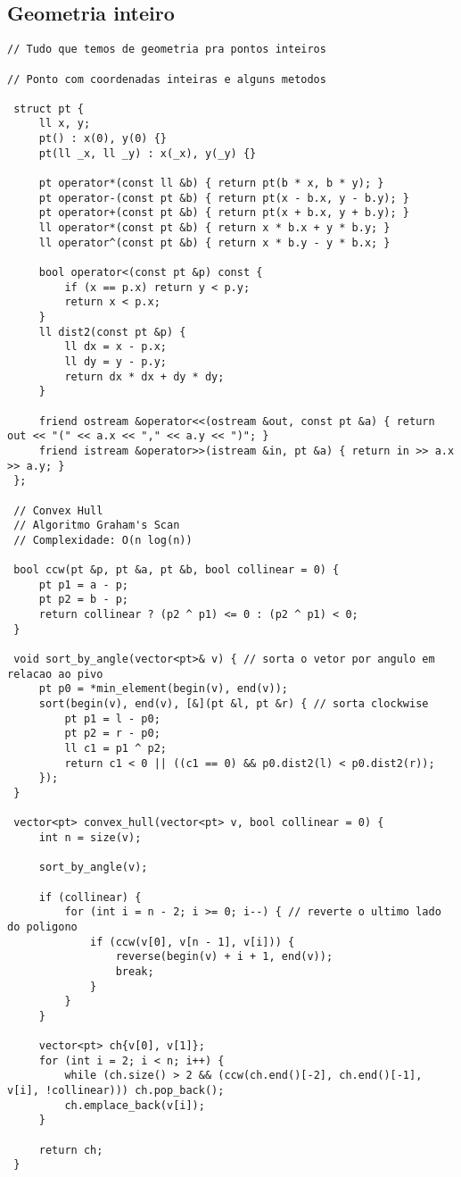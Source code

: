 \documentclass[11pt, a4paper, twoside]{article}
\begin{document}
\subsection{Geometria inteiro}
\begin{lstlisting}
// Tudo que temos de geometria pra pontos inteiros

// Ponto com coordenadas inteiras e alguns metodos

 struct pt {
     ll x, y;
     pt() : x(0), y(0) {}
     pt(ll _x, ll _y) : x(_x), y(_y) {}
 
     pt operator*(const ll &b) { return pt(b * x, b * y); }
     pt operator-(const pt &b) { return pt(x - b.x, y - b.y); }
     pt operator+(const pt &b) { return pt(x + b.x, y + b.y); }
     ll operator*(const pt &b) { return x * b.x + y * b.y; }
     ll operator^(const pt &b) { return x * b.y - y * b.x; }
 
     bool operator<(const pt &p) const {
         if (x == p.x) return y < p.y;
         return x < p.x;
     }
     ll dist2(const pt &p) {
         ll dx = x - p.x;
         ll dy = y - p.y;
         return dx * dx + dy * dy;
     }
 
     friend ostream &operator<<(ostream &out, const pt &a) { return out << "(" << a.x << "," << a.y << ")"; }
     friend istream &operator>>(istream &in, pt &a) { return in >> a.x >> a.y; }
 };
 
 // Convex Hull
 // Algoritmo Graham's Scan
 // Complexidade: O(n log(n))
 
 bool ccw(pt &p, pt &a, pt &b, bool collinear = 0) {
     pt p1 = a - p;
     pt p2 = b - p;
     return collinear ? (p2 ^ p1) <= 0 : (p2 ^ p1) < 0;
 }
 
 void sort_by_angle(vector<pt>& v) { // sorta o vetor por angulo em relacao ao pivo
     pt p0 = *min_element(begin(v), end(v));
     sort(begin(v), end(v), [&](pt &l, pt &r) { // sorta clockwise
         pt p1 = l - p0;
         pt p2 = r - p0;
         ll c1 = p1 ^ p2;
         return c1 < 0 || ((c1 == 0) && p0.dist2(l) < p0.dist2(r));
     });
 }
 
 vector<pt> convex_hull(vector<pt> v, bool collinear = 0) {
     int n = size(v);
 
     sort_by_angle(v);
 
     if (collinear) {
         for (int i = n - 2; i >= 0; i--) { // reverte o ultimo lado do poligono
             if (ccw(v[0], v[n - 1], v[i])) {
                 reverse(begin(v) + i + 1, end(v));
                 break;
             }
         }
     }
 
     vector<pt> ch{v[0], v[1]};
     for (int i = 2; i < n; i++) {
         while (ch.size() > 2 && (ccw(ch.end()[-2], ch.end()[-1], v[i], !collinear))) ch.pop_back();
         ch.emplace_back(v[i]);
     }
 
     return ch;
 }
\end{lstlisting}
\end{document}
